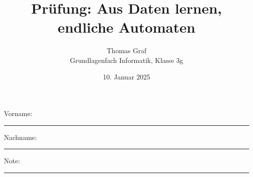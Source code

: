 \newtoggle{withbonus} \togglefalse{withbonus} %

\newcommand{\mycourse}{Grundlagenfach Informatik}
\newcommand{\myclass}{Klasse 3g}
\newcommand{\mydate}{10. Januar 2025}

\title{\textbf{Prüfung: Aus Daten lernen, endliche Automaten}}
\author{Thomas Graf\\
	\mycourse, \myclass}
\date{\mydate}
\maketitle
\thispagestyle{headandfoot}

\begin{center}
\end{center}
\vspace{10mm}

\begin{center}
	Vorname: \rule{45mm}{0.8pt}\qquad Nachname: \rule{45mm}{0.8pt}
\end{center}
\vspace{20mm}

\begin{center}
	\iftoggle{withbonus} {
		\combinedgradetable[h][questions]
	} {
		\gradetable[h][questions]
	}
\end{center}
\vspace{15mm}
\begin{center}
	Note:
	\vspace{10mm}

	\rule{8mm}{1.2pt}
\end{center}
\clearpage


